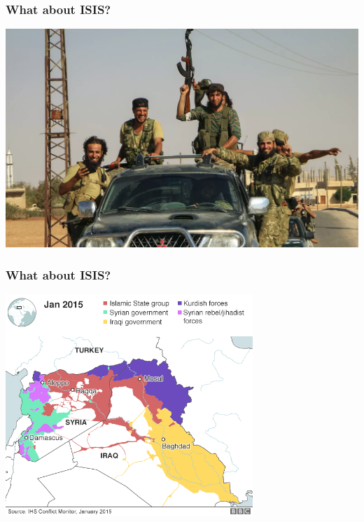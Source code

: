 \documentclass[aspectratio=43]{beamer}
\begin{document}
\begin{frame}
\frametitle{What about ISIS?}
\centering

\includegraphics[width = \textwidth]{img/isis}

\end{frame}

\begin{frame}
\frametitle{What about ISIS?}
\centering

\includegraphics[width = 0.7\textwidth]{img/isis_terrctrl}

\end{frame}
\end{document}
